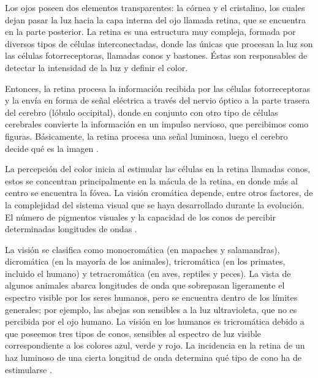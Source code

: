 \documentclass[10pt]{article}
\begin{document}
Los ojos poseen dos elementos transparentes: la córnea y el cristalino, los cuales dejan pasar la luz hacia la capa interna del ojo llamada retina, que se encuentra en la parte posterior. La retina es una estructura muy compleja, formada por diversos tipos de células interconectadas, donde las únicas que procesan la luz son las células fotorreceptoras, llamadas conos y bastones. Éstas son responsables de detectar la intensidad de la luz y definir el color\cite{IEEEreferencias:Ref12}.

\setlength{\parskip}{2mm}

Entonces, la retina procesa la información recibida por las células fotorreceptoras y la envía en forma de señal eléctrica a través del nervio óptico a la parte trasera del cerebro (lóbulo occipital), donde en conjunto con otro tipo de células cerebrales convierte la información en un impulso nervioso, que percibimos como figuras. Básicamente, la retina procesa una señal luminosa, luego el cerebro decide qué es la imagen \cite{IEEEreferencias:Ref12}.

\setlength{\parskip}{2mm}

La percepción del color inicia al estimular las células en la retina llamadas conos, estos  se concentran principalmente en la mácula de la retina, en donde más al centro se encuentra la fóvea. La visión cromática depende, entre otros factores, de la complejidad del sistema visual que se haya desarrollado durante la evolución. El número de pigmentos visuales y la capacidad de los conos de percibir determinadas longitudes de ondas \cite{IEEEreferencias:Ref12}.

\setlength{\parskip}{2mm}

La visión se clasifica como monocromática (en mapaches y salamandras), dicromática (en la mayoría de los animales), tricromática (en los primates, incluido el humano) y tetracromática (en aves, reptiles y peces). La vista de algunos animales abarca longitudes de onda que sobrepasan ligeramente el espectro visible por los seres humanos, pero se encuentra dentro de los límites generales; por ejemplo, las abejas son sensibles a la luz ultravioleta, que no es percibida por el ojo humano. La visión en los humanos es tricromática debido a que poseemos tres tipos de conos, sensibles al espectro de luz visible correspondiente a los colores azul, verde y rojo. La incidencia en la retina de un haz luminoso de una cierta longitud de onda determina qué tipo de cono ha de estimularse \cite{IEEEreferencias:Ref12}.

\setlength{\parskip}{2mm}
\end{document}
